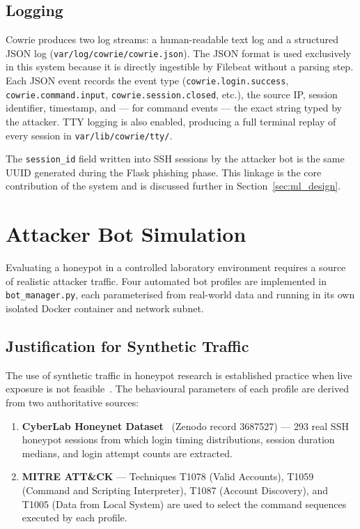 \subsection{Logging}

Cowrie produces two log streams: a human-readable text log and a structured
JSON log (\texttt{var/log/cowrie/cowrie.json}). The JSON format is used
exclusively in this system because it is directly ingestible by Filebeat without
a parsing step. Each JSON event records the event type (\texttt{cowrie.login.success},
\texttt{cowrie.command.input}, \texttt{cowrie.session.closed}, etc.), the source
IP, session identifier, timestamp, and — for command events — the exact string
typed by the attacker. TTY logging is also enabled, producing a full terminal
replay of every session in \texttt{var/lib/cowrie/tty/}.

The \texttt{session\_id} field written into SSH sessions by the attacker bot is
the same UUID generated during the Flask phishing phase. This linkage is the
core contribution of the system and is discussed further in
Section~\ref{sec:ml_design}.


\section{Attacker Bot Simulation}
\label{sec:bots}

Evaluating a honeypot in a controlled laboratory environment requires a source
of realistic attacker traffic. Four automated bot profiles are implemented in
\texttt{bot\_manager.py}, each parameterised from real-world data and
running in its own isolated Docker container and network subnet.

\subsection{Justification for Synthetic Traffic}

The use of synthetic traffic in honeypot research is established practice when
live exposure is not feasible~\cite{BCF12}. The behavioural parameters of each
profile are derived from two authoritative sources:

\begin{enumerate}
    \item \textbf{CyberLab Honeynet Dataset}~\cite{RF06} (Zenodo record
    3687527) — 293 real SSH honeypot sessions from which login timing
    distributions, session duration medians, and login attempt counts are
    extracted.
    \item \textbf{MITRE ATT\&CK} — Techniques T1078 (Valid Accounts), T1059
    (Command and Scripting Interpreter), T1087 (Account Discovery), and T1005
    (Data from Local System) are used to select the command sequences executed
    by each profile.
\end{enumerate}

